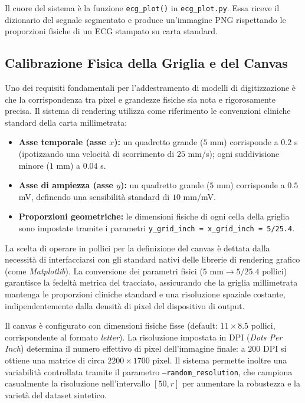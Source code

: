 Il cuore del sistema è la funzione \texttt{ecg\_plot()} in \texttt{ecg\_plot.py}. Essa riceve il dizionario del segnale segmentato e produce un'immagine PNG rispettando le proporzioni fisiche di un ECG stampato su carta standard.

\subsection{Calibrazione Fisica della Griglia e del Canvas}

Uno dei requisiti fondamentali per l'addestramento di modelli di digitizzazione è che la corrispondenza tra pixel e grandezze fisiche sia nota e rigorosamente precisa. Il sistema di rendering utilizza come riferimento le convenzioni cliniche standard della carta millimetrata:

\begin{itemize}
    \item \textbf{Asse temporale (asse $x$):} un quadretto grande ($5$ mm) corrisponde a $0.2$ s (ipotizzando una velocità di scorrimento di $25$ mm/s); ogni suddivisione minore ($1$ mm) a $0.04$ s.
    \item \textbf{Asse di ampiezza (asse $y$):} un quadretto grande ($5$ mm) corrisponde a $0.5$ mV, definendo una sensibilità standard di $10$ mm/mV.
    \item \textbf{Proporzioni geometriche:} le dimensioni fisiche di ogni cella della griglia sono impostate tramite i parametri \texttt{y\_grid\_inch = x\_grid\_inch = 5/25.4}. 
\end{itemize}

La scelta di operare in pollici per la definizione del canvas è dettata dalla necessità di interfacciarsi con gli standard nativi delle librerie di rendering grafico (come \textit{Matplotlib}). La conversione dei parametri fisici ($5 \text{ mm} \rightarrow 5/25.4 \text{ pollici}$) garantisce la fedeltà metrica del tracciato, assicurando che la griglia millimetrata mantenga le proporzioni cliniche standard e una risoluzione spaziale costante, indipendentemente dalla densità di pixel del dispositivo di output.

Il canvas è configurato con dimensioni fisiche fisse (default: $11 \times 8.5$ pollici, corrispondente al formato \textit{letter}). La risoluzione impostata in DPI (\textit{Dots Per Inch}) determina il numero effettivo di pixel dell'immagine finale: a $200$ DPI si ottiene una matrice di circa $2200 \times 1700$ pixel. Il sistema permette inoltre una variabilità controllata tramite il parametro \texttt{--random\_resolution}, che campiona casualmente la risoluzione nell'intervallo $[50, r]$ per aumentare la robustezza e la varietà del dataset sintetico.


